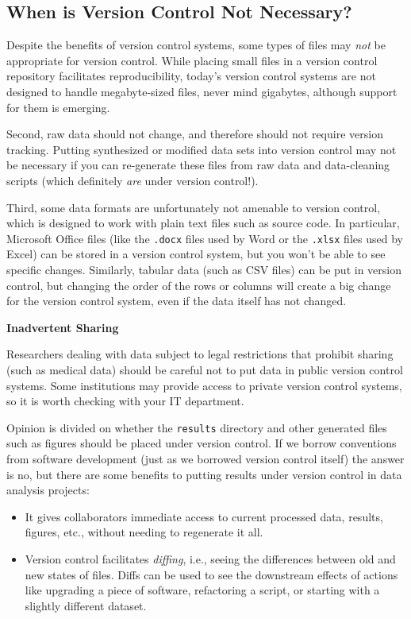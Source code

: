 \documentclass[10pt]{article}
\begin{document}
\subsection*{When is Version Control Not Necessary?}

Despite the benefits of version control systems, some types of files
may \emph{not} be appropriate for version control. While placing 
small files in a version control repository facilitates
reproducibility, today's version control systems are not
designed to handle megabyte-sized files, never mind gigabytes, although
support for them is emerging.

Second, raw data should not change, and therefore should not require
version tracking. Putting synthesized or modified data sets into
version control may not be necessary if you can re-generate these
files from raw data and data-cleaning scripts (which definitely
\emph{are} under version control!).

Third, some data formats are unfortunately not amenable to version
control, which is designed to work with plain text files such as
source code.  In particular, Microsoft Office files (like the
\texttt{.docx} files used by Word or the \texttt{.xlsx} files used by
Excel) can be stored in a version control system, but you won't be
able to see specific changes. Similarly, tabular data (such as CSV
files) can be put in version control, but changing the order of the
rows or columns will create a big change for the version control
system, even if the data itself has not changed.

\begin{framed}
  \noindent \textbf{Inadvertent Sharing}

  Researchers dealing with data subject to legal restrictions that
  prohibit sharing (such as medical data) should be careful not to put
  data in public version control systems. Some institutions may provide
  access to private version control systems, so it is worth checking with
  your IT department.
\end{framed}

Opinion is divided on whether the \texttt{results} directory and other
generated files such as figures should be placed under version
control. If we borrow conventions from software development (just as
we borrowed version control itself) the answer is no, but there are
some benefits to putting results under version control in data
analysis projects:

\begin{itemize}
\item
  It gives collaborators immediate access to current processed data,
  results, figures, etc., without needing to regenerate it all.
\item
  Version control facilitates \emph{diffing}, i.e., seeing the
  differences between old and new states of files. Diffs can be used to
  see the downstream effects of actions like upgrading a piece of
  software, refactoring a script, or starting with a slightly different
  dataset.
\end{itemize}
\end{document}
